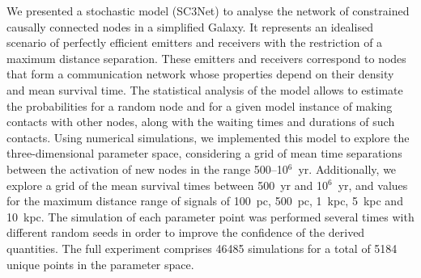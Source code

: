 \documentclass[crop]{CSLB}
\begin{document}
We presented a stochastic model (SC3Net) to analyse the network of
constrained causally connected nodes in a simplified Galaxy.
%
It represents an idealised scenario of perfectly efficient emitters and
receivers with the restriction of a maximum distance separation.
%
These emitters and receivers correspond to nodes that form a
communication network whose properties depend on their density
and mean survival time.
%
The statistical analysis of the model allows to estimate the
probabilities for a random node and for a given model instance of
making contacts with other nodes, along with the waiting times and
durations of such contacts.
%
Using numerical simulations, we implemented this model to explore the
three-dimensional parameter space, considering a grid of mean time
separations between the activation of new nodes
in the range 500--10$^6$~yr.
%
Additionally, we explore a grid of the mean survival times between 
500~yr and 10$^6$~yr, and values for the maximum distance range of signals 
of 100~pc, 500~pc, 1~kpc, 5~kpc and 10~kpc.
%
The simulation of each parameter point was performed several times
with different random seeds in order to improve the confidence of the
derived quantities.
%
The full experiment comprises 46485 simulations for a total of 5184
unique points in the parameter space.



\end{document}
